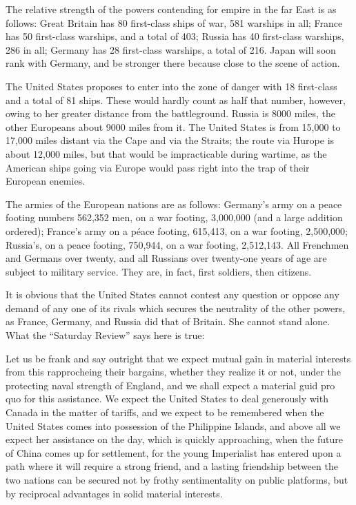 \documentclass[11pt,openany]{book}
\begin{document}
The relative strength of the powers contending for empire in the far East is as follows: Great Britain has 80 first-class ships of war, 581 warships in all; France has 50 first-class warships, and a total of 403; Russia has 40 first-class warships, 286 in all; Germany has 28 first-class warships, a total of 216. Japan will soon rank with Germany, and be stronger there because close to the scene of action.

The United States proposes to enter into the zone of danger with 18 first-class and a total of 81 ships. These would hardly count as half that number, however, owing to her greater distance from the battleground. Russia is 8000 miles, the other Europeans about 9000 miles from it. The United States is from 15,000 to 17,000 miles distant via the Cape and via the Straits; the route via Hurope is about 12,000 miles, but that would be impracticable during wartime, as the American ships going via Europe would pass right into the trap of their European enemies.

The armies of the European nations are as follows: Germany's army on a peace footing numbers 562,352 men, on a war footing, 3,000,000 (and a large addition ordered); France's army on a péace footing, 615,413, on a war footing, 2,500,000; Russia's, on a peace footing, 750,944, on a war footing, 2,512,143. All Frenchmen and Germans over twenty, and all Russians over twenty-one years of age are subject to military service. They are, in fact, first soldiers, then citizens.

It is obvious that the United States cannot contest any question or oppose any demand of any one of its rivals which secures the neutrality of the other powers, as France, Germany, and Russia did that of Britain. She cannot stand alone. What the ``Saturday Review'' says here is true:

Let us be frank and say outright that we expect mutual gain in material interests from this rapprocheing their bargains, whether they realize it or not, under the protecting naval strength of England, and we shall expect a material guid pro quo for this assistance. We expect the United States to deal generously with Canada in the matter of tariffs, and we expect to be remembered when the United States comes into possession of the Philippine Islands, and above all we expect her assistance on the day, which is quickly approaching, when the future of China comes up for settlement, for the young Imperialist has entered upon a path where it will require a strong friend, and a lasting friendship between the two nations can be secured not by frothy sentimentality on public platforms, but by reciprocal advantages in solid material interests.
\end{document}
